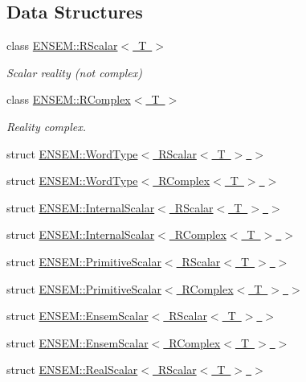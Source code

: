 \subsection*{Data Structures}
\begin{DoxyCompactItemize}
\item 
class \mbox{\hyperlink{classENSEM_1_1RScalar}{E\+N\+S\+E\+M\+::\+R\+Scalar$<$ T $>$}}
\begin{DoxyCompactList}\small\item\em Scalar reality (not complex) \end{DoxyCompactList}\item 
class \mbox{\hyperlink{classENSEM_1_1RComplex}{E\+N\+S\+E\+M\+::\+R\+Complex$<$ T $>$}}
\begin{DoxyCompactList}\small\item\em Reality complex. \end{DoxyCompactList}\item 
struct \mbox{\hyperlink{structENSEM_1_1WordType_3_01RScalar_3_01T_01_4_01_4}{E\+N\+S\+E\+M\+::\+Word\+Type$<$ R\+Scalar$<$ T $>$ $>$}}
\item 
struct \mbox{\hyperlink{structENSEM_1_1WordType_3_01RComplex_3_01T_01_4_01_4}{E\+N\+S\+E\+M\+::\+Word\+Type$<$ R\+Complex$<$ T $>$ $>$}}
\item 
struct \mbox{\hyperlink{structENSEM_1_1InternalScalar_3_01RScalar_3_01T_01_4_01_4}{E\+N\+S\+E\+M\+::\+Internal\+Scalar$<$ R\+Scalar$<$ T $>$ $>$}}
\item 
struct \mbox{\hyperlink{structENSEM_1_1InternalScalar_3_01RComplex_3_01T_01_4_01_4}{E\+N\+S\+E\+M\+::\+Internal\+Scalar$<$ R\+Complex$<$ T $>$ $>$}}
\item 
struct \mbox{\hyperlink{structENSEM_1_1PrimitiveScalar_3_01RScalar_3_01T_01_4_01_4}{E\+N\+S\+E\+M\+::\+Primitive\+Scalar$<$ R\+Scalar$<$ T $>$ $>$}}
\item 
struct \mbox{\hyperlink{structENSEM_1_1PrimitiveScalar_3_01RComplex_3_01T_01_4_01_4}{E\+N\+S\+E\+M\+::\+Primitive\+Scalar$<$ R\+Complex$<$ T $>$ $>$}}
\item 
struct \mbox{\hyperlink{structENSEM_1_1EnsemScalar_3_01RScalar_3_01T_01_4_01_4}{E\+N\+S\+E\+M\+::\+Ensem\+Scalar$<$ R\+Scalar$<$ T $>$ $>$}}
\item 
struct \mbox{\hyperlink{structENSEM_1_1EnsemScalar_3_01RComplex_3_01T_01_4_01_4}{E\+N\+S\+E\+M\+::\+Ensem\+Scalar$<$ R\+Complex$<$ T $>$ $>$}}
\item 
struct \mbox{\hyperlink{structENSEM_1_1RealScalar_3_01RScalar_3_01T_01_4_01_4}{E\+N\+S\+E\+M\+::\+Real\+Scalar$<$ R\+Scalar$<$ T $>$ $>$}}

\end{DoxyCompactItemize}

